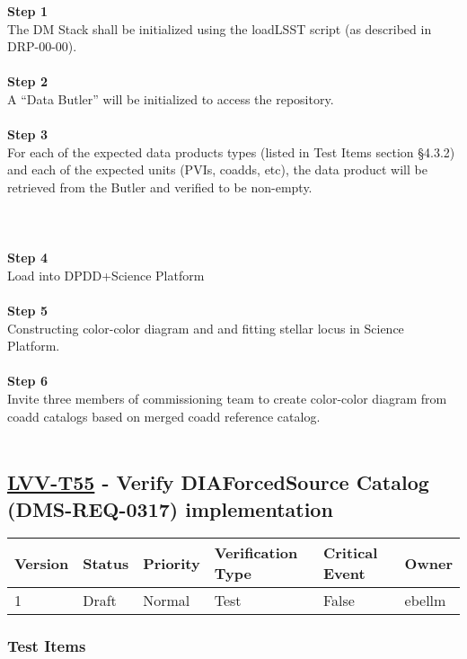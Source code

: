 \textbf{Step 1}\\
The DM Stack shall be initialized using the loadLSST script (as
described in DRP-00-00).\\
~\\
\textbf{Step 2}\\
A ``Data Butler'' will be initialized to access the repository.\\
~\\
\textbf{Step 3}\\
For each of the expected data products types (listed in Test Items
section §4.3.2) and each of the expected units (PVIs, coadds, etc), the
data product will be retrieved from the Butler and verified to be
non-empty.\\
~\\
~\\
~\\
\textbf{Step 4}\\
Load into DPDD+Science Platform\\
~\\
\textbf{Step 5}\\
Constructing color-color diagram and and fitting stellar locus in
Science Platform.\\
~\\
\textbf{Step 6}\\
Invite three members of commissioning team to create color-color diagram
from coadd catalogs based on merged coadd reference catalog.\\
~\\

\hypertarget{lvv-t55---verify-diaforcedsource-catalog-dms-req-0317-implementation}{%
\subsection{\texorpdfstring{\href{https://jira.lsstcorp.org/secure/Tests.jspa\#/testCase/LVV-T55}{LVV-T55}
- Verify DIAForcedSource Catalog (DMS-REQ-0317)
implementation}{LVV-T55 - Verify DIAForcedSource Catalog (DMS-REQ-0317) implementation}}\label{lvv-t55---verify-diaforcedsource-catalog-dms-req-0317-implementation}}

\begin{longtable}[]{@{}llllll@{}}
\toprule
Version & Status & Priority & Verification Type & Critical Event &
Owner\tabularnewline
\midrule
\endhead
1 & Draft & Normal & Test & False & ebellm\tabularnewline
\bottomrule
\end{longtable}

\hypertarget{test-items-10}{%
\subsubsection{Test Items}\label{test-items-10}}

